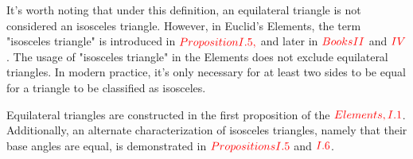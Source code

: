It's worth noting that under this definition, an equilateral triangle is not considered an isosceles triangle. However, in Euclid's Elements, the term "isosceles triangle" is introduced in $\textcolor{red}{Proposition I.5,}$ and later in $\textcolor{red}{Books II}$ and $\textcolor{red}{IV}$. The usage of "isosceles triangle" in the Elements does not exclude equilateral triangles. In modern practice, it's only necessary for at least two sides to be equal for a triangle to be classified as isosceles.

\clearpage

Equilateral triangles are constructed in the first proposition of the $\textcolor{red}{Elements, I.1}$. Additionally, an alternate characterization of isosceles triangles, namely that their base angles are equal, is demonstrated in $\textcolor{red}{Propositions I.5}$ and $\textcolor{red}{I.6}$.


\clearpage